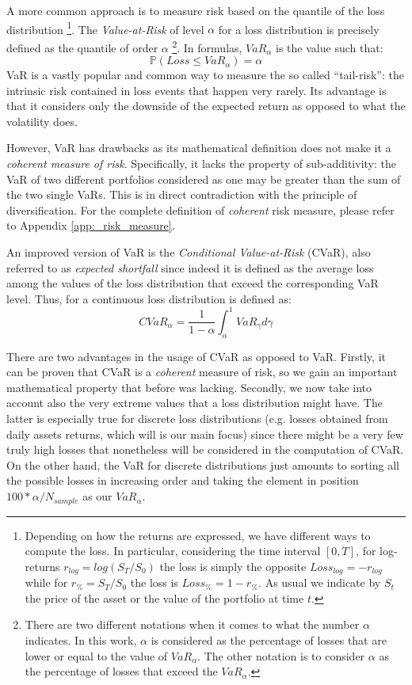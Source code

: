 A more common approach is to measure risk based on the quantile of the loss distribution \footnote{Depending on how the returns are expressed, we have different ways to compute the loss. In particular, considering the time interval $[0, T]$, for log-returns $r_{log}=log(S_T/S_0)$ the loss is simply the opposite $Loss_{log} = - r_{log}$ while for $r_\% = S_T/S_0$  the loss is $Loss_\% = 1 - r_\%$. As usual we indicate by $S_t$ the price  of the asset or the value of the portfolio at time $t$.}. The \textit{Value-at-Risk} of level $\alpha$ for a loss distribution is precisely defined as the quantile of order $\alpha$ \footnote{ There are two different notations when it comes to what the number $\alpha$ indicates. In this work, $\alpha$ is considered as the percentage of losses that are lower or equal to the value of $VaR_\alpha$. The other notation is to consider $\alpha$ as the percentage of losses that exceed the $VaR_\alpha$. }.  In formulas, $VaR_\alpha$ is the value such that:
\begin{equation}
\mathbb{P}(Loss \leq VaR_\alpha) = \alpha
\end{equation}
VaR is a vastly popular and common way to measure the so called ``tail-risk'': the intrinsic risk contained in loss events that happen very rarely. 
Its advantage is that it considers only the downside of the expected return as opposed to what the volatility does.

However, VaR has drawbacks as its mathematical definition does not make it a \textit{coherent measure of risk}. Specifically, it lacks the property of sub-additivity: the VaR of two different portfolios  considered as one may be greater than the sum of the two single VaRs. This is in direct contradiction with the principle of diversification.
For the complete definition of \textit{coherent} risk measure, please refer to Appendix \ref{app:_risk_measure}.

\bigskip
An improved version of VaR is the \textit{Conditional Value-at-Risk} (CVaR), also referred to as \textit{expected shortfall} since indeed it is defined as the average loss among the values of the loss distribution that exceed the corresponding VaR level. Thus, for a continuous loss distribution is defined as:
\begin{equation}
	CVaR_\alpha = \frac{1}{1-\alpha} \int_{\alpha}^{1} VaR_\gamma d\gamma 
\end{equation}

There are two advantages in the usage of CVaR as opposed to VaR. Firstly, it can be proven that CVaR is a \textit{coherent} measure of risk, so we gain an important mathematical property that before was lacking. Secondly, we now take into account also the very extreme values that a loss distribution might have. The latter is especially true for discrete loss distributions (e.g. losses obtained from daily assets returns, which will is our main focus) since there might be a very few  truly high losses that nonetheless will be considered in the computation of CVaR. On the other hand, the VaR for discrete distributions just amounts to sorting all the possible losses in increasing order and taking the element in position $100*\alpha / N_{sample}$ as our $VaR_\alpha$. 

